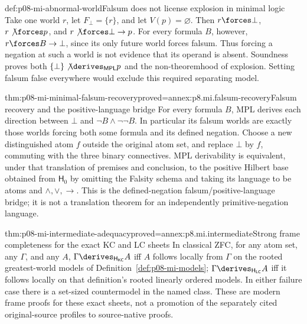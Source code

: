 \begin{hbexample}{def:p08-mi-abnormal-world}{Falsum does not license explosion in minimal logic}
Take one world \(r\), let \(F_{\bot}=\{r\}\), and let \(V(p)=\varnothing\).
Then \(r\forces\bot\), \(r\not\forces p\), and
\(r\not\forces\bot\to p\). For every formula \(B\), however,
\(r\forces B\to\bot\), since its only future world forces falsum.
Thus forcing a negation at such a world is not evidence that its operand
is absent. Soundness proves both \(\{\bot\}\not\derives_{\mathsf{MPL}}p\)
and the non-theoremhood of explosion. Setting falsum false everywhere
would exclude this required separating model.
\end{hbexample}

\begin{hbtheorem}{thm:p08-mi-minimal-falsum-recovery}{proved=annex:p8.mi.falsum-recovery}{Falsum recovery and the positive-language bridge}
For every formula \(B\), MPL derives each direction between \(\bot\)
and \(\neg B\land\neg\neg B\). In particular its falsum worlds are
exactly those worlds forcing both some formula and its defined negation.
Choose a new distinguished atom \(f\) outside the original atom set,
and replace \(\bot\) by \(f\), commuting with the three binary
connectives. MPL derivability is equivalent, under that translation of
premises and conclusion, to the positive Hilbert base obtained from
\(\mathsf H_0\) by omitting the Falsity schema and taking its language
to be atoms and \(\land,\lor,\to\). This is the defined-negation
falsum/positive-language bridge; it is not a translation theorem for
an independently primitive-negation language.
\end{hbtheorem}

\begin{hbtheorem}{thm:p08-mi-intermediate-adequacy}{proved=annex:p8.mi.intermediate}{Strong frame completeness for the exact KC and LC sheets}
In classical ZFC, for any atom set, any \(\Gamma\), and any \(A\),
\(\Gamma\derives_{\mathsf H_{\mathsf{KC}}}A\) iff \(A\) follows locally
from \(\Gamma\) on the rooted greatest-world models of
Definition~\ref{def:p08-mi-models};
\(\Gamma\derives_{\mathsf H_{\mathsf{LC}}}A\) iff it follows locally
on that definition's rooted linearly ordered models. In either failure
case there is a set-sized countermodel in the named class.
These are modern frame proofs for these exact sheets, not a promotion
of the separately cited original-source profiles to source-native proofs.
\end{hbtheorem}

